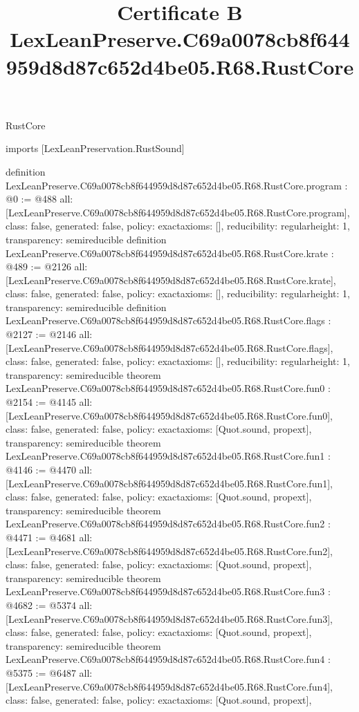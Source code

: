 \begin{lexlean}{RustCore}
\title{Certificate B LexLeanPreserve.C69a0078cb8f644959d8d87c652d4be05.R68.RustCore}
\begin{coremodule}
imports [LexLeanPreservation.RustSound]

definition LexLeanPreserve.C69a0078cb8f644959d8d87c652d4be05.R68.RustCore.program : @0 := @488 {
  all: [LexLeanPreserve.C69a0078cb8f644959d8d87c652d4be05.R68.RustCore.program],
  class: false,
  generated: false,
  policy: exact{axioms: []},
  reducibility: regular{height: 1},
  transparency: semireducible
}
definition LexLeanPreserve.C69a0078cb8f644959d8d87c652d4be05.R68.RustCore.krate : @489 := @2126 {
  all: [LexLeanPreserve.C69a0078cb8f644959d8d87c652d4be05.R68.RustCore.krate],
  class: false,
  generated: false,
  policy: exact{axioms: []},
  reducibility: regular{height: 1},
  transparency: semireducible
}
definition LexLeanPreserve.C69a0078cb8f644959d8d87c652d4be05.R68.RustCore.flags : @2127 := @2146 {
  all: [LexLeanPreserve.C69a0078cb8f644959d8d87c652d4be05.R68.RustCore.flags],
  class: false,
  generated: false,
  policy: exact{axioms: []},
  reducibility: regular{height: 1},
  transparency: semireducible
}
theorem LexLeanPreserve.C69a0078cb8f644959d8d87c652d4be05.R68.RustCore.fun0 : @2154 := @4145 {
  all: [LexLeanPreserve.C69a0078cb8f644959d8d87c652d4be05.R68.RustCore.fun0],
  class: false,
  generated: false,
  policy: exact{axioms: [Quot.sound, propext]},
  transparency: semireducible
}
theorem LexLeanPreserve.C69a0078cb8f644959d8d87c652d4be05.R68.RustCore.fun1 : @4146 := @4470 {
  all: [LexLeanPreserve.C69a0078cb8f644959d8d87c652d4be05.R68.RustCore.fun1],
  class: false,
  generated: false,
  policy: exact{axioms: [Quot.sound, propext]},
  transparency: semireducible
}
theorem LexLeanPreserve.C69a0078cb8f644959d8d87c652d4be05.R68.RustCore.fun2 : @4471 := @4681 {
  all: [LexLeanPreserve.C69a0078cb8f644959d8d87c652d4be05.R68.RustCore.fun2],
  class: false,
  generated: false,
  policy: exact{axioms: [Quot.sound, propext]},
  transparency: semireducible
}
theorem LexLeanPreserve.C69a0078cb8f644959d8d87c652d4be05.R68.RustCore.fun3 : @4682 := @5374 {
  all: [LexLeanPreserve.C69a0078cb8f644959d8d87c652d4be05.R68.RustCore.fun3],
  class: false,
  generated: false,
  policy: exact{axioms: [Quot.sound, propext]},
  transparency: semireducible
}
theorem LexLeanPreserve.C69a0078cb8f644959d8d87c652d4be05.R68.RustCore.fun4 : @5375 := @6487 {
  all: [LexLeanPreserve.C69a0078cb8f644959d8d87c652d4be05.R68.RustCore.fun4],
  class: false,
  generated: false,
  policy: exact{axioms: [Quot.sound, propext]},
}
\end{coremodule}
\end{lexlean}
